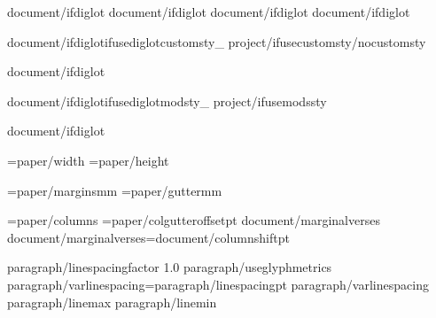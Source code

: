 


{document/ifdiglot}\diglottrue
{document/ifdiglot}\diglotcolumns
{document/ifdiglot}
{document/ifdiglot}


{document/ifdiglot}{ifusediglotcustomsty_}
{project/ifusecustomsty}{/nocustomsty}

{document/ifdiglot} %

{document/ifdiglot}{ifusediglotmodsty_} %
{project/ifusemodssty} %

{document/ifdiglot}

\PaperWidth={paper/width}
\PaperHeight={paper/height}

\MarginUnit={paper/margins}mm
\def\TopMarginFactor{{{paper/topmarginfactor}}}
\def\BottomMarginFactor{{{paper/bottommarginfactor}}}
\def\SideMarginFactor{{{paper/sidemarginfactor}}}
\BindingGutter={paper/gutter}mm

\BodyColumns={paper/columns}
\def\ColumnGutterFactor{{{document/colgutterfactor}}}
\ColumnGutterRuleSkip={paper/colgutteroffset}pt
{document/marginalverses}
{document/marginalverses}\columnshift={document/columnshift}pt
\def\PageFullFactor{{0.66}}

\def\LineSpacingFactor{L_}{{{paragraph/linespacingfactor}}}
\def\VerticalSpaceFactor{L_}{{1.0}}
{paragraph/useglyphmetrics}
{paragraph/varlinespacing}\baselineskip={paragraph/linespacing}pt {paragraph/varlinespacing} {paragraph/linemax} {paragraph/linemin}

